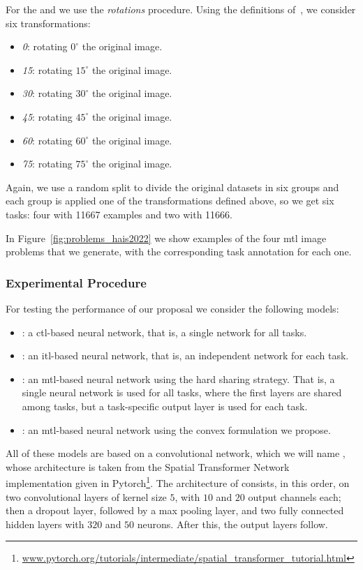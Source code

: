 %
For the  and  we use the \emph{rotations} procedure. Using the definitions of~\cite{GhifaryKZB15}, we consider six transformations:
\begin{itemize}
    \item \textit{0}: rotating $0^{\circ}$ the original image.
    \item \textit{15}: rotating $15^{\circ}$ the original image.
    \item \textit{30}: rotating $30^{\circ}$ the original image.
    \item \textit{45}: rotating $45^{\circ}$ the original image.
    \item \textit{60}: rotating $60^{\circ}$ the original image.
    \item \textit{75}: rotating $75^{\circ}$ the original image.
\end{itemize}
Again, we use a random split to divide the original datasets in six groups and each group is applied one of the transformations defined above, so we get six tasks: four with \num{11667} examples and two with \num{11666}.
%

In Figure~\ref{fig:problems_hais2022} we show examples of the four \acrshort{mtl} image problems that we generate, with the corresponding task annotation for each one.



\subsubsection*{Experimental Procedure}
For testing the performance of our proposal we consider the following models:
\begin{itemize}
    \item {}: a \acrshort{ctl}-based neural network, that is, a single network for all tasks.
    \item {}: an \acrshort{itl}-based neural network, that is, an independent network for each task.
    \item {}: an \acrshort{mtl}-based neural network using the hard sharing strategy. That is, a single neural network is used for all tasks, where the first layers are shared among tasks, but a task-specific output layer is used for each task.
    \item {}: an \acrshort{mtl}-based neural network using the convex formulation we propose.
\end{itemize}
All of these models are based on a convolutional network, which we will name , whose architecture is taken from the Spatial Transformer Network~\citep{Jaderberg_2015} implementation given in Pytorch\footnote{\href{www.pytorch.org/tutorials/intermediate/spatial\_transformer\_tutorial.html}{www.pytorch.org/tutorials/intermediate/spatial\_transformer\_tutorial.html}}.
The architecture of  consists, in this order, on two convolutional layers of kernel size $5$, with $10$ and $20$ output channels each; then a dropout layer, followed by a max pooling layer, and two fully connected hidden layers with $320$ and $50$ neurons. After this, the output layers follow.

